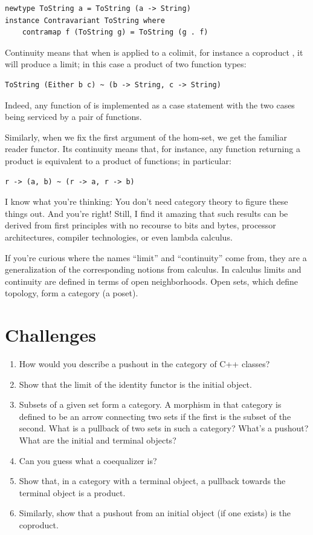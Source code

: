 \begin{Verbatim}[commandchars=\\\{\}]
newtype ToString a = ToString (a -> String) 
instance Contravariant ToString where 
    contramap f (ToString g) = ToString (g . f)
\end{Verbatim}
Continuity means that when  is applied to a colimit,
for instance a coproduct , it will produce a limit;
in this case a product of two function types:

\begin{Verbatim}[commandchars=\\\{\}]
ToString (Either b c) ~ (b -> String, c -> String)
\end{Verbatim}
Indeed, any function of  is implemented as a case
statement with the two cases being serviced by a pair of functions.

Similarly, when we fix the first argument of the hom-set, we get the
familiar reader functor. Its continuity means that, for instance, any
function returning a product is equivalent to a product of functions; in
particular:

\begin{Verbatim}[commandchars=\\\{\}]
r -> (a, b) ~ (r -> a, r -> b)
\end{Verbatim}
I know what you're thinking: You don't need category theory to figure
these things out. And you're right! Still, I find it amazing that such
results can be derived from first principles with no recourse to bits
and bytes, processor architectures, compiler technologies, or even
lambda calculus.

If you're curious where the names ``limit'' and ``continuity'' come
from, they are a generalization of the corresponding notions from
calculus. In calculus limits and continuity are defined in terms of open
neighborhoods. Open sets, which define topology, form a category (a
poset).

\section{Challenges}\label{challenges}

\begin{enumerate}
\tightlist
\item
  How would you describe a pushout in the category of C++ classes?
\item
  Show that the limit of the identity functor
   is the initial object.
\item
  Subsets of a given set form a category. A morphism in that category is
  defined to be an arrow connecting two sets if the first is the subset
  of the second. What is a pullback of two sets in such a category?
  What's a pushout? What are the initial and terminal objects?
\item
  Can you guess what a coequalizer is?
\item
  Show that, in a category with a terminal object, a pullback towards
  the terminal object is a product.
\item
  Similarly, show that a pushout from an initial object (if one exists)
  is the coproduct.
\end{enumerate}